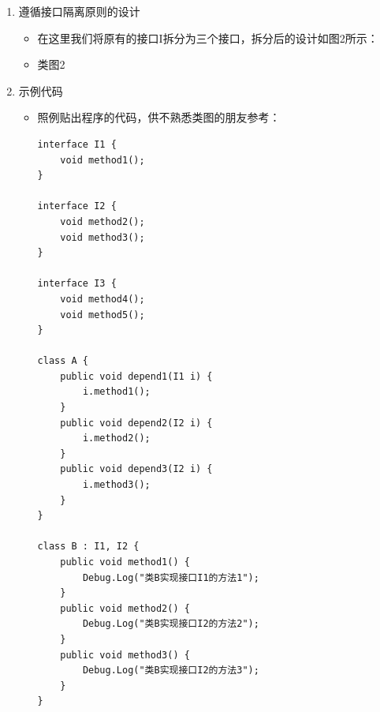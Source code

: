 \documentclass[9pt, b5paper]{article}
\begin{document}
\begin{enumerate}
\begin{itemize}
\begin{verbatim}
class C {
    public void depend1(I i) {
        i.method1();
    }
    public void depend2(I i) {
        i.method4();
    }
    public void depend3(I i) {
        i.method5();
    }
}

class D : I {
    public void method1() {
        Debug.Log("类D实现接口I的方法1");
    }
    //对于类D来说，method2和method3不是必需的，但是由于接口A中有这两个方法，
    //所以在实现过程中即使这两个方法的方法体为空，也要将这两个没有作用的方法进行实现。
    public void method2() { }
    public void method3() { }
    public void method4() {
        Debug.Log("类D实现接口I的方法4");
    }
    public void method5() {
        Debug.Log("类D实现接口I的方法5");
    }
}

public class Client {
    void Start() {
        A a = new A();
        a.depend1(new B());
        a.depend2(new B());
        a.depend3(new B());
        C c = new C();
        c.depend1(new D()));
        c.depend2(new D());
        c.depend3(new D());
    }
}
\end{verbatim}
\item 可以看到，如果接口过于臃肿，只要接口中出现的方法，不管对依赖于它的类有没有用处，实现类中都必须去实现这些方法，这显然不是好的设计。
\item 如果将这个设计修改为符合接口隔离原则，就必须对接口I进行拆分。
\end{itemize}
\item 遵循接口隔离原则的设计
\label{sec:org2a4585a}
\begin{itemize}
\item 在这里我们将原有的接口I拆分为三个接口，拆分后的设计如图2所示：
\item 类图2
\end{itemize}
\item 示例代码
\label{sec:orgdf4a9d3}
\begin{itemize}
\item 照例贴出程序的代码，供不熟悉类图的朋友参考：
\begin{verbatim}
interface I1 {
    void method1();
}

interface I2 {
    void method2();
    void method3();
}

interface I3 {
    void method4();
    void method5();
}

class A {
    public void depend1(I1 i) {
        i.method1();
    }
    public void depend2(I2 i) {
        i.method2();
    }
    public void depend3(I2 i) {
        i.method3();
    }
}

class B : I1, I2 {
    public void method1() {
        Debug.Log("类B实现接口I1的方法1");
    }
    public void method2() {
        Debug.Log("类B实现接口I2的方法2");
    }
    public void method3() {
        Debug.Log("类B实现接口I2的方法3");
    }
}


\end{verbatim}
\end{itemize}
\end{enumerate}
\end{document}
